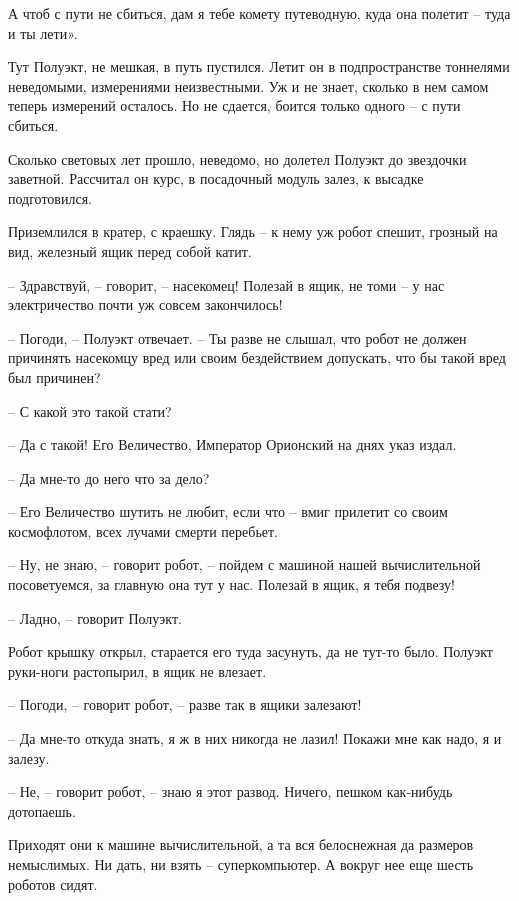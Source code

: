 \documentclass[ebook,oneside,final,openright]{memoir}
\begin{document}
А чтоб с пути не сбиться, дам я тебе комету путеводную, куда она полетит – туда и ты лети».\par
\par
Тут Полуэкт, не мешкая, в путь пустился. Летит он в подпространстве тоннелями неведомыми, измерениями неизвестными. Уж и не знает, сколько в нем самом теперь измерений осталось. Но не сдается, боится только одного – с пути сбиться.\par
\par
Сколько световых лет прошло, неведомо, но долетел Полуэкт до звездочки заветной. Рассчитал он курс, в посадочный модуль залез, к высадке подготовился.\par
\par
Приземлился в кратер, с краешку. Глядь – к нему уж робот спешит, грозный на вид, железный ящик перед собой катит.\par
– Здравствуй, – говорит, – насекомец! Полезай в ящик, не томи – у нас электричество почти уж совсем закончилось!\par
– Погоди, – Полуэкт отвечает. – Ты разве не слышал, что робот не должен причинять насекомцу вред или своим бездействием допускать, что бы такой вред был причинен?\par
– С какой это такой стати?\par
– Да с такой! Его Величество, Император Орионский на днях указ издал.\par
– Да мне-то до него что за дело?\par
– Его Величество шутить не любит, если что – вмиг прилетит со своим космофлотом, всех лучами смерти перебьет.\par
– Ну, не знаю, – говорит робот, – пойдем с машиной нашей вычислительной посоветуемся, за главную она тут у нас. Полезай в ящик, я тебя подвезу!\par
– Ладно, – говорит Полуэкт.\par
Робот крышку открыл, старается его туда засунуть, да не тут-то было. Полуэкт руки-ноги растопырил, в ящик не влезает. \par
– Погоди, – говорит робот, – разве так в ящики залезают! \par
– Да мне-то откуда знать, я ж в них никогда не лазил! Покажи мне как надо, я и залезу. \par
– Не, – говорит робот, – знаю я этот развод. Ничего, пешком как-нибудь дотопаешь.\par
\par
Приходят они к машине вычислительной, а та вся белоснежная да размеров немыслимых. Ни дать, ни взять – суперкомпьютер. А вокруг нее еще шесть роботов сидят. \par
\end{document}
